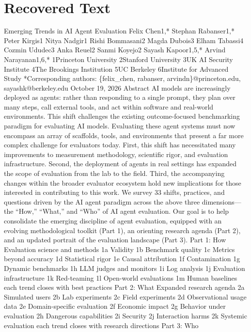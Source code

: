 \section{Recovered Text}
Emerging Trends in AI Agent Evaluation
Felix Chen1,*
Stephan Rabanser1,*
Peter Kirgis1
Nitya Nadgir1
Rishi Bommasani2
Magda Dubois3
Elham Tabassi4
Cozmin Ududec3
Anka Reuel2
Sanmi Koyejo2
Sayash Kapoor1,5,*
Arvind Narayanan1,6,*
1Princeton University
2Stanford University
3UK AI Security Institute
4The Brookings Institution
5UC Berkeley
6Institute for Advanced Study
*Corresponding authors: \{felix\_chen, rabanser, arvindn\}@princeton.edu, sayashk@berkeley.edu
October 19, 2026
Abstract
AI models are increasingly deployed as agents: rather than responding to a single prompt, they plan
over many steps, call external tools, and act within software and real-world environments. This shift
challenges the existing outcome-focused benchmarking paradigm for evaluating AI models. Evaluating
these agent systems must now encompass an array of scaffolds, tools, and environments that present a
far more complex challenge for evaluators today. First, this shift has necessitated many improvements
to measurement methodology, scientific rigor, and evaluation infrastructure. Second, the deployment
of agents in real settings has expanded the scope of evaluation from the lab to the field. Third, the
accompanying changes within the broader evaluator ecosystem hold new implications for those interested
in contributing to this work. We survey 33 shifts, practices, and questions driven by the AI agent paradigm
across the above three dimensions—the “How,” “What,” and “Who” of AI agent evaluation. Our goal is to
help consolidate the emerging discipline of agent evaluation, equipped with an evolving methodological
toolkit (Part 1), an orienting research agenda (Part 2), and an updated portrait of the evaluation
landscape (Part 3).
Part 1: How
Evaluation science and methods
1a
Validity
1b
Benchmark quality
1c
Metrics beyond accuracy
1d
Statistical rigor
1e
Causal attribution
1f
Contamination
1g
Dynamic benchmarks
1h
LLM judges and monitors
1i
Log analysis
1j
Evaluation infrastructure
1k
Red-teaming
1l
Open-world evaluations
1m Human baselines
each trend closes with
best practices
Part 2: What
Expanded research agenda
2a Simulated users
2b Lab experiments
2c Field experiments
2d Observational usage data
2e Domain-specific evaluation
2f
Economic impact
2g Behavior under evaluation
2h Dangerous capabilities
2i
Security
2j
Interaction harms
2k Systemic evaluation
each trend closes with
research directions
Part 3: Who
